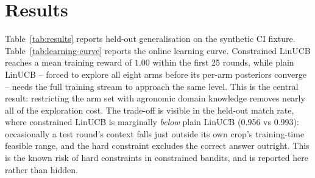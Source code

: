 \section{Results}
\label{sec:results}


Table~\ref{tab:results} reports held-out generalisation on the synthetic CI
fixture. Table~\ref{tab:learning-curve} reports the online learning curve.
Constrained LinUCB reaches a mean training reward of $1.00$ within the
first 25 rounds, while plain LinUCB -- forced to explore all eight arms
before its per-arm posteriors converge -- needs the full training stream to
approach the same level. This is the central result: restricting the arm
set with agronomic domain knowledge removes nearly all of the exploration
cost. The trade-off is visible in the held-out match rate, where
constrained LinUCB is marginally \emph{below} plain LinUCB (0.956 vs 0.993):
occasionally a test round's context falls just outside its own crop's
training-time feasible range, and the hard constraint excludes the correct
answer outright. This is the known risk of hard constraints in constrained
bandits, and is reported here rather than hidden.
